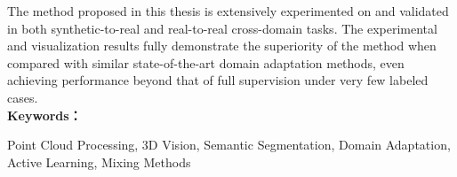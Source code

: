 The method proposed in this thesis is extensively experimented on and validated in both synthetic-to-real and real-to-real cross-domain tasks. The experimental and visualization results fully demonstrate the superiority of the method when compared with similar state-of-the-art domain adaptation methods, even achieving performance beyond that of full supervision under very few labeled cases.\\

\noindent\textbf{Keywords：} 
\begin{minipage}[t]{0.85\linewidth}
	Point Cloud Processing, 3D Vision, Semantic Segmentation,  Domain Adaptation, Active Learning, Mixing Methods
\end{minipage}

\clearpage